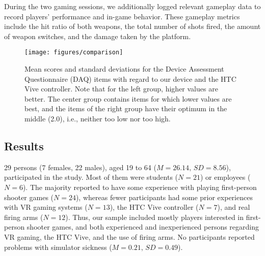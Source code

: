 \documentclass{sigchi}
\begin{document}
During the two gaming sessions, we additionally logged relevant gameplay data to record players' performance and in-game behavior. These gameplay metrics include the hit ratio of both weapons, the total number of shots fired, the amount of weapon switches, and the damage taken by the platform.




\begin{figure*}[t!]
\centering
\texttt{[image: figures/comparison]}
\caption{Mean scores and standard deviations for the Device Assessment Questionnaire (DAQ) items with regard to our device and the HTC Vive controller. Note that for the left group, higher values are better. The center group contains items for which lower values are best, and the items of the right group have their optimum in the middle (2.0), i.e., neither too low nor too high.
}
\label{fig:comparison}
\end{figure*}

\subsection{Results}
29 persons (7 females, 22 males), aged 19 to 64 ($M = 26.14,\,SD = 8.56$), participated in the study. Most of them were students ($N = 21$) or employees ($N = 6$). The majority reported to have some experience with playing first-person shooter games ($N = 24$), whereas fewer participants had some prior experiences with VR gaming systems ($N = 13$), the HTC Vive controller ($N = 7$), and real firing arms ($N = 12$). Thus, our sample included mostly players interested in first-person shooter games, and both experienced and inexperienced persons regarding VR gaming, the HTC Vive, and the use of firing arms. No participants reported problems with simulator sickness ($M = 0.21,\,SD = 0.49$).
\end{document}
